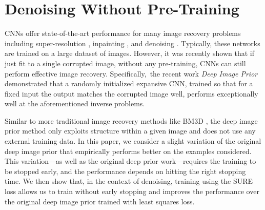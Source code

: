 \documentclass{article}
\begin{document}
%

\section{Denoising Without Pre-Training\label{sec:OneShotDenoising}}

CNNs offer state-of-the-art performance for many image recovery problems including super-resolution \cite{SRCNN}, inpainting \cite{yang2017high}, and denoising \cite{DnCNN}.
Typically, these networks are trained on a large dataset of images. 
However, it was recently shown that if just fit to a single corrupted image, without any pre-training, CNNs can still perform effective image recovery. 
Specifically,~the recent work {\it Deep Image Prior}\cite{DeepImagePrior} demonstrated that a randomly initialized expansive CNN, trained so that for a fixed input the output matches the corrupted image well, performs exceptionally well at the aforementioned inverse problems.

Similar to more traditional image recovery methods like BM3D \cite{BM3D}, the deep image prior method only exploits structure within a given image and does not use any external training data.
In this paper, we consider a slight variation of the original deep image prior that empirically performs better on the examples considered.
This variation---as well as the original deep prior work---requires the training to be stopped early, and the performance depends on hitting the right stopping time.
We then show that, in the context of denoising, training using the SURE loss allows us to train without early stopping and improves the performance over the original deep image prior trained with least squares loss.
\end{document}
